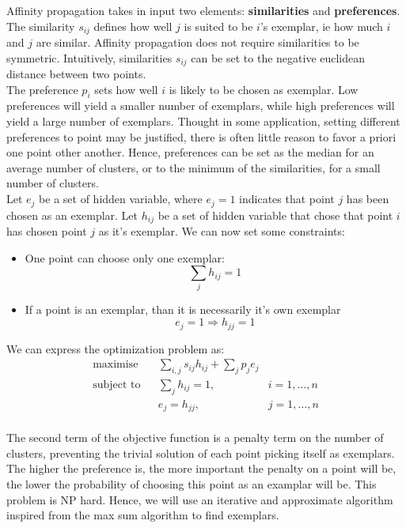 \documentclass{ipol}
\begin{document}
Affinity propagation takes in input two elements: \textbf{similarities} and
\textbf{preferences}. The similarity $s_{ij}$ defines how well $j$ is suited
to be $i$'s exemplar, ie how much $i$ and $j$ are similar. Affinity
propagation does not require similarities to be symmetric. Intuitively,
similarities $s_{ij}$ can be set to the negative euclidean distance between
two points. \\

The preference $p_i$ sets how well $i$ is likely to be chosen as exemplar. Low
preferences will yield a smaller number of exemplars, while high preferences
will yield a large number of exemplars. Thought in some application, setting
different preferences to point may be justified, there is often little reason
to favor a priori one point other another. Hence, preferences can be set as
the median for an average number of clusters, or to the minimum of the
similarities, for a small number of clusters. \\

Let $e_j$ be a set of hidden variable, where $e_j = 1$ indicates that point
$j$ has been chosen as an exemplar. Let $h_{ij}$ be a set of hidden variable
that chose that point $i$ has chosen point $j$ as it's exemplar. We can now
set some constraints:
\begin{itemize}
\item One point can choose only one exemplar:
\begin{equation*}
\sum_{j} h_{ij} = 1
\end{equation*}
\item If a point is an exemplar, than it is necessarily it's own exemplar
\begin{equation*}
e_{j} = 1 \Rightarrow h_{jj} = 1
\end{equation*}
\end{itemize}

We can express the optimization problem as:
\begin{equation*}
\renewcommand{\arraystretch}{2}
\begin{array}{ccll}
\text{maximise} & & \sum_{i, j} s_{ij} h_{ij} + \sum_{j} p_j e_j & \\
\text{subject to} &  & \sum_{j} h_{ij} = 1, & i = 1, \dots, n \\
		  &  & e_{j} = h_{jj}, & j = 1, \dots, n\\
\end{array}
\end{equation*}


The second term of the objective function is a penalty term on the number of clusters, preventing the
trivial solution of each point picking itself as exemplars. The higher the
preference is, the more important the penalty on a point will be, the lower
the probability of choosing this point as an examplar will be. This problem is
NP hard. Hence, we will use an iterative and approximate algorithm inspired
from the max sum algorithm to find exemplars. \\
\end{document}
